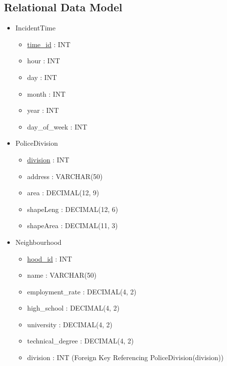 \documentclass[12pt, a4paper]{article}
\begin{document}
\subsection*{Relational Data Model}
\begin{itemize}
    \item IncidentTime
    \begin{itemize}
        \item \underline{time\_id} : \color{blue} INT \color{black}
        \item hour : \color{blue} INT \color{black}
        \item day : \color{blue} INT \color{black}
        \item month : \color{blue} INT \color{black}
        \item year : \color{blue} INT \color{black}
        \item day\_of\_week : \color{blue} INT \color{black}
    \end{itemize}
    \item PoliceDivision
        \begin{itemize}
        \item \underline{division} : \color{blue} INT \color{black}
        \item address : \color{blue} VARCHAR(50) \color{black}
        \item area : \color{blue} DECIMAL(12, 9) \color{black}
        \item shapeLeng : \color{blue} DECIMAL(12, 6)  \color{black}
        \item shapeArea : \color{blue} DECIMAL(11, 3) \color{black}
    \end{itemize}
    \item Neighbourhood
        \begin{itemize}
        \item \underline{hood\_id} : \color{blue} INT \color{black}
        \item name : \color{blue} VARCHAR(50) \color{black}
        \item employment\_rate : \color{blue} DECIMAL(4, 2) \color{black}
        \item high\_school : \color{blue} DECIMAL(4, 2) \color{black}
        \item university : \color{blue} DECIMAL(4, 2)  \color{black}
        \item technical\_degree : \color{blue} DECIMAL(4, 2) \color{black}
        \item division : \color{blue} INT \color{black} (Foreign Key Referencing  PoliceDivision(division))

\end{itemize}
\end{itemize}
\end{document}
